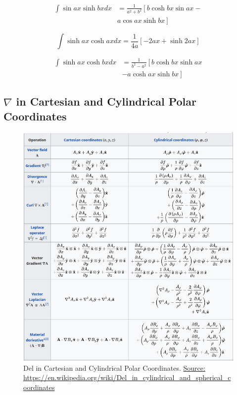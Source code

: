 \documentclass[11pt, letterpaper, notitlepage]{article}
\begin{document}
\begin{multicols}{2}
\begin{footnotesize}
\begin{align}
\int \sin ax \sinh bx dx &= 
\frac{1}{a^2 + b^2} \left[
b \cosh bx \sin ax -
\right . \nonumber \\ & \left .
 a \cos ax \sinh bx
\right] 
\end{align}

\begin{equation}
\int \sinh ax \cosh ax dx= 
\frac{1}{4a}\left[ 
-2ax + \sinh 2ax \right]
\end{equation}

\begin{align}
\int \sinh ax \cosh bx dx&= 
\frac{1}{b^2-a^2}\left[ 
b \cosh bx \sinh ax 
\right . \nonumber \\ & \left .
- a \cosh ax \sinh bx \right]
\end{align}

\end{footnotesize}
\end{multicols}

\subsection{$\nabla$ in Cartesian and Cylindrical Polar Coordinates}
\begin{figure}[H]
  \centering
  \includegraphics[scale=0.5]{DelInOtherCoordinateSystems.png}
  \caption{Del in Cartesian and Cylindrical Polar Coordinates. \underline{Source:} \url{https://en.wikipedia.org/wiki/Del_in_cylindrical_and_spherical_coordinates}}
  \label{fig:galaxy}
\end{figure}
\end{document}
